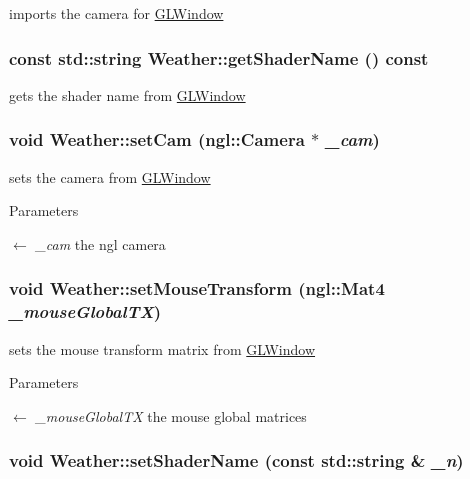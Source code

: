imports the camera for \hyperlink{classGLWindow}{GLWindow} \hypertarget{classWeather_a56d1feb426ec64dbd0d739cf18ed697e}{
\subsubsection[{getShaderName}]{\setlength{\rightskip}{0pt plus 5cm}const std::string Weather::getShaderName () const}}
\label{classWeather_a56d1feb426ec64dbd0d739cf18ed697e}


gets the shader name from \hyperlink{classGLWindow}{GLWindow} \hypertarget{classWeather_a9c19c5387f67875053c4dc274fb7cd49}{
\subsubsection[{setCam}]{\setlength{\rightskip}{0pt plus 5cm}void Weather::setCam (ngl::Camera $\ast$ {\em \_\-cam})}}
\label{classWeather_a9c19c5387f67875053c4dc274fb7cd49}


sets the camera from \hyperlink{classGLWindow}{GLWindow} 
\begin{DoxyParams}{Parameters}
\item[\mbox{$\leftarrow$} {\em \_\-cam}]the ngl camera \end{DoxyParams}
\hypertarget{classWeather_a9440d21e6228408df6b899230355d8b6}{
\subsubsection[{setMouseTransform}]{\setlength{\rightskip}{0pt plus 5cm}void Weather::setMouseTransform (ngl::Mat4 {\em \_\-mouseGlobalTX})}}
\label{classWeather_a9440d21e6228408df6b899230355d8b6}


sets the mouse transform matrix from \hyperlink{classGLWindow}{GLWindow} 
\begin{DoxyParams}{Parameters}
\item[\mbox{$\leftarrow$} {\em \_\-mouseGlobalTX}]the mouse global matrices \end{DoxyParams}
\hypertarget{classWeather_aa4e71bd1c04b189f74cd426ae777cfcf}{
\subsubsection[{setShaderName}]{\setlength{\rightskip}{0pt plus 5cm}void Weather::setShaderName (const std::string \& {\em \_\-n})}}
\label{classWeather_aa4e71bd1c04b189f74cd426ae777cfcf}


